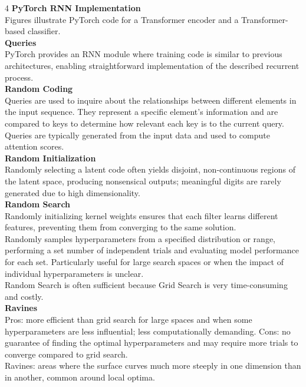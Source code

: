 \documentclass[8pt]{extarticle}
\begin{document}
\begin{multicols}{4}
\vspace{2pt}\textbf{PyTorch RNN Implementation}\\
Figures illustrate PyTorch code for a Transformer encoder and a Transformer-based classifier.\\
\vspace{2pt}\textbf{Queries}\\
PyTorch provides an RNN module where training code is similar to previous architectures, enabling straightforward implementation of the described recurrent process.\\
\vspace{2pt}\textbf{Random Coding}\\
Queries are used to inquire about the relationships between different elements in the input sequence. They represent a specific element's information and are compared to keys to determine how relevant each key is to the current query. Queries are typically generated from the input data and used to compute attention scores.\\
\vspace{2pt}\textbf{Random Initialization}\\
Randomly selecting a latent code often yields disjoint, non-continuous regions of the latent space, producing nonsensical outputs; meaningful digits are rarely generated due to high dimensionality.\\
\vspace{2pt}\textbf{Random Search}\\
Randomly initializing kernel weights ensures that each filter learns different features, preventing them from converging to the same solution.\\
Randomly samples hyperparameters from a specified distribution or range, performing a set number of independent trials and evaluating model performance for each set. Particularly useful for large search spaces or when the impact of individual hyperparameters is unclear.\\
Random Search is often sufficient because Grid Search is very time-consuming and costly.\\
\vspace{2pt}\textbf{Ravines}\\
Pros: more efficient than grid search for large spaces and when some hyperparameters are less influential; less computationally demanding. Cons: no guarantee of finding the optimal hyperparameters and may require more trials to converge compared to grid search.\\
Ravines: areas where the surface curves much more steeply in one dimension than in another, common around local optima.\\

\end{multicols}
\end{document}
